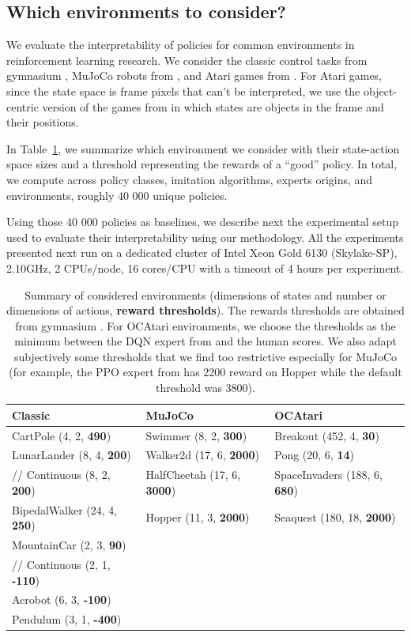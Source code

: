\subsection{Which environments to consider?}
We evaluate the interpretability of policies for common environments in reinforcement learning research.
We consider the classic control tasks from gymnasium \cite{gymnasium}, MuJoCo robots from \cite{mujoco}, and Atari games from \cite{atari}.
For Atari games, since the state space is frame pixels that can't be interpreted, we use the object-centric version of the games from \cite{ocatari} in which states are objects in the frame and their positions.

In Table~\ref{tab:envs}, we summarize which environment we consider with their state-action space sizes and a threshold representing the rewards of a ``good'' policy.
In total, we compute across policy classes, imitation algorithms, experts origins, and environments, roughly 40 000 unique policies.

Using those 40 000 policies as baselines, we describe next the experimental setup used to evaluate their interpretability using our methodology.
All the experiments presented next run on a dedicated cluster of Intel Xeon Gold 6130 (Skylake-SP), 2.10GHz, 2 CPUs/node, 16 cores/CPU with a timeout of 4 hours per experiment.

\begin{table}[ht]
  \centering
  \small
  \begin{tabular}{lll}
  \hline
  \textbf{Classic} & \textbf{MuJoCo} & \textbf{OCAtari}\\
  \hline
  CartPole (4, 2, \textbf{490}) & Swimmer (8, 2, \textbf{300}) & Breakout (452, 4, \textbf{30})\\
  LunarLander (8, 4, \textbf{200}) & Walker2d (17, 6, \textbf{2000}) & Pong (20, 6, \textbf{14})\\
  //    Continuous (8, 2, \textbf{200}) & HalfCheetah (17, 6, \textbf{3000}) & SpaceInvaders (188, 6, \textbf{680})\\
  BipedalWalker (24, 4, \textbf{250}) & Hopper (11, 3, \textbf{2000}) & Seaquest (180, 18, \textbf{2000})\\
  MountainCar (2, 3, \textbf{90}) & \\
  //    Continuous (2, 1, \textbf{-110}) & \\
  Acrobot (6, 3, \textbf{-100}) & \\
  Pendulum (3, 1, \textbf{-400}) & \\
  \hline
  \end{tabular}
  \caption{Summary of considered environments (dimensions of states and number or dimensions of actions, \textbf{reward thresholds}). The rewards thresholds are obtained from gymnasium \cite{gymnasium}. For OCAtari environments, we choose the thresholds as the minimum between the DQN expert from \cite{zoo} and the human scores. We also adapt subjectively some thresholds that we find too restrictive especially for MuJoCo (for example, the PPO expert from \cite{zoo} has 2200 reward on Hopper while the default threshold was 3800).}
  \label{tab:envs}
  \end{table}


